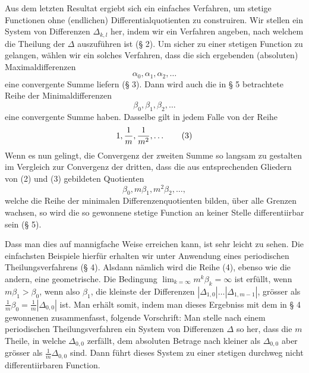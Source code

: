 Aus dem letzten Resultat ergiebt sich ein einfaches Verfahren, um stetige Functionen ohne (endlichen) Differentialquotienten zu construiren. Wir stellen ein System von Differenzen $\Delta_{k,l}$ her, indem wir ein Verfahren angeben, nach welchem die Theilung der $\Delta$ auszuführen ist (§ 2). Um sicher zu einer stetigen Function zu gelangen, wählen wir ein solches Verfahren, dass die sich ergebenden (absoluten) Maximaldifferenzen
\begin{equation}
 \alpha_0,\alpha_1,\alpha_2,\ldots
\tag{1}
\end{equation}
eine convergente Summe liefern (§ 3). Dann wird auch die in § 5 betrachtete Reihe der Minimaldifferenzen
\begin{equation}
 \beta_0,\beta_1,\beta_2,\ldots
\tag{2}
\end{equation}
eine convergente Summe haben. Dasselbe gilt in jedem Falle von der Reihe
\begin{equation}
 1,{1\over m},{1\over m^2},\ldots
\tag{3}
\end{equation}
Wenn es nun gelingt, die Convergenz der zweiten Summe so langsam zu gestalten im Vergleich zur Convergenz der dritten, dass die aus entsprechenden Gliedern von (2) und (3) gebildeten Quotienten
\begin{equation}
 \beta_0,m\beta_1,m^2\beta_2,\ldots,
\tag{4}
\end{equation}
welche die Reihe der minimalen Differenzenquotienten bilden, über alle Grenzen wachsen, so wird die so gewonnene stetige Function an keiner Stelle differentiirbar sein (§ 5).

Dass man dies auf mannigfache Weise erreichen kann, ist sehr leicht zu sehen. Die einfachsten Beispiele hierfür erhalten wir unter Anwendung eines periodischen Theilungsverfahrens (§ 4). Alsdann nämlich wird die Reihe (4), ebenso wie die andern, eine geometrische. Die Bedingung $\lim_{k=\infty}m^k\beta_k=\infty$ ist erfüllt, wenn $m\beta_1>\beta_0$, wenn also $\beta_1$, die kleinste der Differenzen $|\Delta_{1,0}|\ldots|\Delta_{1,m-1}|$, grösser als $\frac1m\beta_0=\frac1m|\Delta_{0,0}|$ ist. Man erhält somit, indem man dieses Ergebniss mit dem in § 4 gewonnenen zusammenfasst, folgende Vorschrift: Man stelle nach einem periodischen Theilungsverfahren ein System von Differenzen $\Delta$ so her, dass die $m$ Theile, in welche $\Delta_{0,0}$ zerfällt, dem absoluten Betrage nach kleiner als $\Delta_{0,0}$ aber grösser als $\frac1m\Delta_{0,0}$ sind. Dann führt dieses System zu einer stetigen durchweg nicht differentiirbaren Function.

